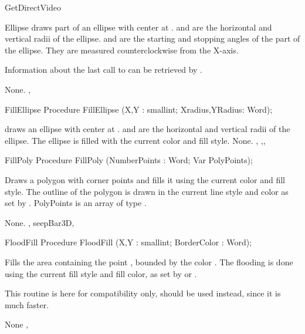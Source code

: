 \begin{function}{GetDirectVideo}
\begin{procedure}{Ellipse}
\Description
  draws part of an ellipse with center at .
 and  are the horizontal and vertical radii of the
ellipse.  and  are the starting and stopping angles of
the part of the ellipse. They are measured counterclockwise from the X-axis.

Information about the last call to  can be retrieved by
.

\Errors
None.
\SeeAlso
{} , 
\end{procedure}
\begin{procedure}{FillEllipse}
\Declaration
Procedure FillEllipse (X,Y : smallint; Xradius,YRadius: Word);

\Description
  draws an ellipse with center at .
 and  are the horizontal and vertical radii of the
ellipse. The ellipse is filled with the current color and fill style.
\Errors
None.
\SeeAlso
{} ,
,, 
\end{procedure}

\begin{procedure}{FillPoly}
\Declaration
Procedure FillPoly (NumberPoints : Word; Var PolyPoints);

\Description

Draws a polygon with  corner points and fills it
using the current color and fill style. The outline of the polygon
is drawn in the current line style and color as set by .
PolyPoints is an array of type .

\Errors
None.
\SeeAlso
{}, seep{Bar3D}, 
\end{procedure}
\begin{procedure}{FloodFill}
\Declaration
Procedure FloodFill (X,Y : smallint; BorderColor : Word);

\Description

Fills the area containing the point , bounded by the color
. The flooding is done using the current fill style
and fill color, as set by  or .

This routine is here for compatibility only,  should be
used instead, since it is much faster.

\Errors
None
\SeeAlso
{},
\end{procedure}


\end{function}
